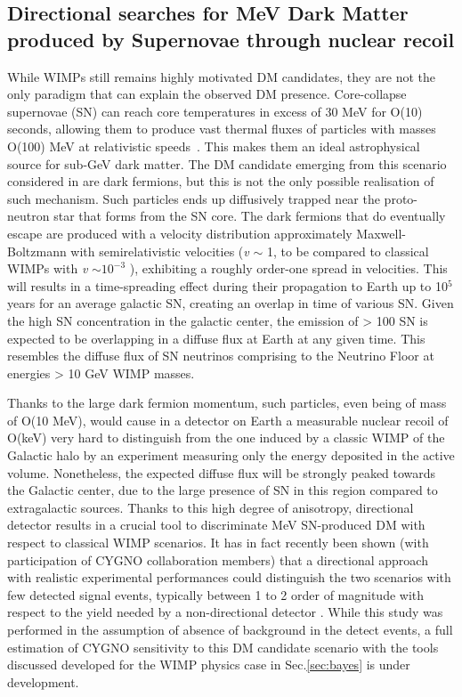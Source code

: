 \documentclass[physics,article,submit,moreauthors,pdftex]{Definitions/mdpi}
\begin{document}
\subsection{Directional searches for MeV Dark Matter produced by Supernovae through nuclear recoil}
While WIMPs still remains highly motivated DM candidates, they are not the only paradigm that can explain the observed DM presence. Core-collapse supernovae (SN) can reach core temperatures in excess of 30 MeV for O(10) seconds, allowing them to produce vast thermal fluxes of particles with masses O(100) MeV at relativistic speeds~\cite{DeRocco:2019jti}. This makes them an ideal astrophysical source for sub-GeV dark matter. The DM candidate emerging from this scenario considered in \cite{DeRocco:2019jti} are dark fermions, but this is not the only possible realisation of such mechanism. Such particles ends up diffusively trapped near the proto-neutron star that forms from the SN core. The dark fermions that do eventually escape are produced with a velocity distribution approximately Maxwell-Boltzmann with semirelativistic velocities ({\it v} $\sim$ 1, to be compared to classical WIMPs with {\it v} $\sim 10^{-3}$  ), exhibiting a roughly order-one spread in velocities. This will results in a time-spreading effect during their propagation to Earth up to 10$^5$ years for an average galactic SN, creating an overlap in time of various SN. Given the high SN concentration in the galactic center, the emission of > 100 SN is expected to be overlapping in a diffuse flux at Earth at any given time. This resembles the diffuse flux of SN neutrinos comprising to the Neutrino Floor at energies > 10 GeV WIMP masses.


Thanks to the large dark fermion momentum, such particles, even being of mass of O(10 MeV), would cause in a detector on Earth a measurable nuclear recoil of O(keV) very hard to distinguish from the one induced by a classic WIMP of the Galactic halo by an experiment measuring only the energy deposited in the active volume. Nonetheless, the expected diffuse flux will be strongly peaked towards the Galactic center, due to the large presence of SN in this region compared to extragalactic sources. Thanks to this high degree of anisotropy, directional detector results in a crucial tool to discriminate MeV SN-produced DM with respect to classical WIMP scenarios. It has in fact recently been shown (with participation of CYGNO collaboration members) that a directional approach with realistic experimental performances could distinguish the two scenarios with few detected signal events, typically between 1 to 2 order of magnitude with respect to the yield needed by a non-directional detector \cite{Baracchini:2020owr}. While this study was performed in the assumption of absence of background in the detect events, a full estimation of CYGNO sensitivity to this DM candidate scenario with the tools discussed developed for the WIMP physics case in Sec.\ref{sec:bayes} is under development.
\end{document}

